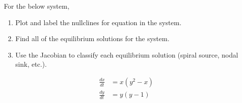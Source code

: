 \documentclass[11pt, titlepage]{article}
\begin{document}
    \pagebreak

    \begin{problem}[Judson 5.1.5]
        For the below system,
        \begin{enumerate}[label=\alph*.]
            \item Plot and label the nullclines for equation in the system.
            \item Find all of the equilibrium solutions for the system.
            \item Use the Jacobian to classify each equilibrium solution (spiral
                source, nodal sink, etc.).
        \end{enumerate}
        \begin{align*}
            \frac{dx}{dt} &= x(y^2-x) \\
            \frac{dy}{dt} &= y(y-1)
        \end{align*}
    \end{problem}
\end{document}
